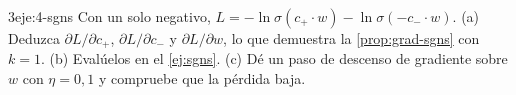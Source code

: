 \begin{ejercicio}{3}{eje:4-sgns}
Con un solo negativo, $L=-\ln\sigma(c_{+}\cdot w)-\ln\sigma(-c_{-}\cdot w)$. (a) Deduzca $\partial L/\partial c_{+}$, $\partial L/\partial c_{-}$ y $\partial L/\partial w$, lo que demuestra la \cref{prop:grad-sgns} con $k=1$. (b) Evalúelos en el \cref{ej:sgns}. (c) Dé un paso de descenso de gradiente sobre $w$ con $\eta=0{,}1$ y compruebe que la pérdida baja.
\end{ejercicio}
